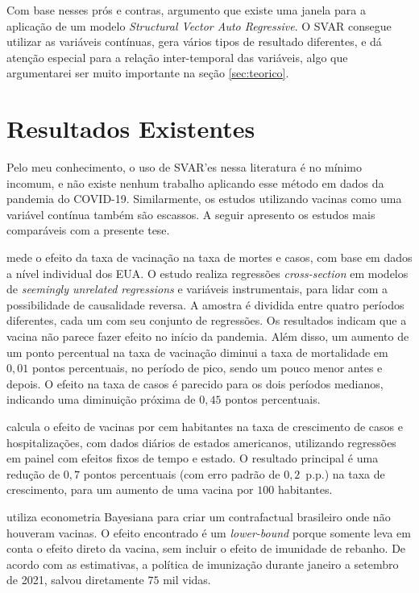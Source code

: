 \documentclass[
    article,
	12pt,				%
	oneside,			%
	a4paper,			%
	english,			%
	brazil,				%
	hyperref = {colorlinks, citecolor=c1d, linkcolor=c2d, urlcolor=c3d, colorlinks}
	]{abntex2}
\newcounter{j}
\begin{document}
Com base nesses prós e contras, argumento que existe uma janela para a aplicação de um modelo \textit{Structural Vector Auto Regressive}. O SVAR consegue utilizar as variáveis contínuas, gera vários tipos de resultado diferentes, e dá atenção especial para a relação inter-temporal das variáveis, algo que argumentarei ser muito importante na seção \ref{sec:teorico}.


\section{Resultados Existentes}

Pelo meu conhecimento, o uso de SVAR'es nessa literatura é no mínimo incomum, e não existe nenhum trabalho aplicando esse método em dados da pandemia do COVID-19. Similarmente, os estudos utilizando vacinas como uma variável contínua também são escassos. A seguir apresento os estudos mais comparáveis com a presente tese.

\textcite{Barro2022} mede o efeito da taxa de vacinação na taxa de mortes e casos, com base em dados a nível individual dos EUA. O estudo realiza regressões \textit{cross-section} em modelos de \textit{seemingly unrelated regressions} e variáveis instrumentais, para lidar com a possibilidade de causalidade reversa. A amostra é dividida entre quatro períodos diferentes, cada um com seu conjunto de regressões. Os resultados indicam que a vacina não parece fazer efeito no início da pandemia. Além disso, um aumento de um ponto percentual na taxa de vacinação diminui a taxa de mortalidade em $0,01$ pontos percentuais, no período de pico, sendo um pouco menor antes e depois. O efeito na taxa de casos é parecido para os dois períodos medianos, indicando uma diminuição próxima de $0,45$ pontos percentuais.

\textcite{Chen2022} calcula o efeito de vacinas por cem habitantes na taxa de crescimento de casos e hospitalizações, com dados diários de estados americanos, utilizando regressões em painel com efeitos fixos de tempo e estado. O resultado principal é uma redução de $0,7$ pontos percentuais (com erro padrão de $0,2$\ p.p.) na taxa de crescimento, para um aumento de uma vacina por $100$ habitantes.

\textcite{Ferreira2021} utiliza econometria Bayesiana para criar um contrafactual brasileiro onde não houveram vacinas. O efeito encontrado é um \textit{lower-bound} porque somente leva em conta o efeito direto da vacina, sem incluir o efeito de imunidade de rebanho. De acordo com as estimativas, a política de imunização durante janeiro a setembro de 2021, salvou diretamente $75$ mil vidas.
\end{document}
